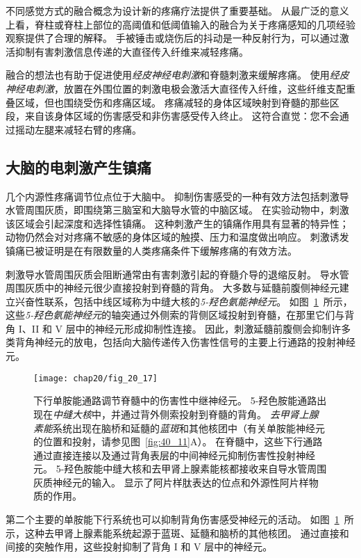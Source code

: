 不同感觉方式的融合概念为设计新的疼痛疗法提供了重要基础。
从最广泛的意义上看，脊柱或脊柱上部位的高阈值和低阈值输入的融合为关于疼痛感知的几项经验观察提供了合理的解释。
手被锤击或烧伤后的抖动是一种反射行为，可以通过激活抑制有害刺激信息传递的大直径传入纤维来减轻疼痛。


融合的想法也有助于促进使用\textit{经皮神经电刺激}和脊髓刺激来缓解疼痛。
使用\textit{经皮神经电刺激}，放置在外围位置的刺激电极会激活大直径传入纤维，这些纤维支配重叠区域，但也围绕受伤和疼痛区域。
疼痛减轻的身体区域映射到脊髓的那些区段，来自该身体区域的伤害感受和非伤害感受传入终止。
这符合直觉：您不会通过摇动左腿来减轻右臂的疼痛。



\subsection{大脑的电刺激产生镇痛}

几个内源性疼痛调节位点位于大脑中。
抑制伤害感受的一种有效方法包括刺激导水管周围灰质，即围绕第三脑室和大脑导水管的中脑区域。
在实验动物中，刺激该区域会引起深度和选择性镇痛。
这种刺激产生的镇痛作用具有显著的特异性；
动物仍然会对对疼痛不敏感的身体区域的触摸、压力和温度做出响应。
刺激诱发镇痛已被证明是在有限数量的人类疼痛条件下缓解疼痛的有效方法。


刺激导水管周围灰质会阻断通常由有害刺激引起的脊髓介导的退缩反射。
导水管周围灰质中的神经元很少直接投射到脊髓的背角。 
大多数与延髓前腹侧神经元建立兴奋性联系，包括中线区域称为中缝大核的\textit{5-羟色氨能神经元}。
如图~\ref{fig:20_17}~所示，这些\textit{5-羟色氨能神经元}的轴突通过外侧索的背侧区域投射到脊髓，在那里它们与背角 I、II 和 V 层中的神经元形成抑制性连接。
因此，刺激延髓前腹侧会抑制许多类背角神经元的放电，包括向大脑传递传入伤害性信号的主要上行通路的投射神经元。


\begin{figure}[htbp]
	\centering
	\texttt{[image: chap20/fig\_20\_17]}
	\caption{下行单胺能通路调节脊髓中的伤害性中继神经元。
		5-羟色胺能通路出现在\textit{中缝大核}中，并通过背外侧索投射到脊髓的背角。
		\textit{去甲肾上腺素能}系统出现在脑桥和延髓的\textit{蓝斑}和其他核团中（有关单胺能神经元的位置和投射，请参见图~\ref{fig:40_11}A）。
		在脊髓中，这些下行通路通过直接连接以及通过背角表层的中间神经元抑制伤害性投射神经元。
		5-羟色胺能中缝大核和去甲肾上腺素能核都接收来自导水管周围灰质神经元的输入。
		显示了阿片样肽表达的位点和外源性阿片样物质的作用。}
	\label{fig:20_17}
\end{figure}


第二个主要的单胺能下行系统也可以抑制背角伤害感受神经元的活动。
如图~\ref{fig:20_17}~所示，这种去甲肾上腺素能系统起源于蓝斑、延髓和脑桥的其他核团。
通过直接和间接的突触作用，这些投射抑制了背角 I 和 V 层中的神经元。



